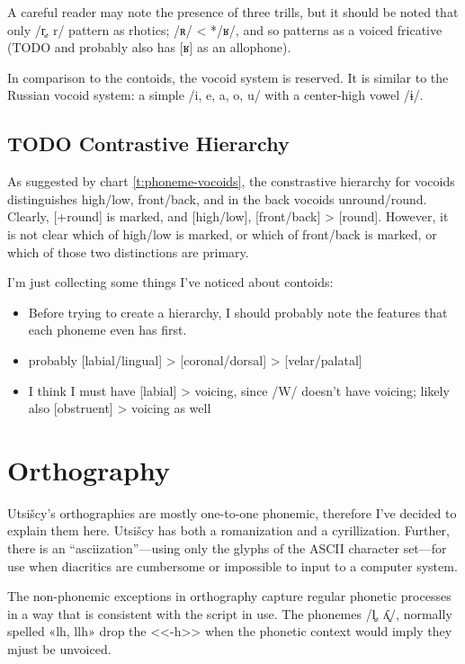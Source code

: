 \documentclass[12pt]{book} %
\begin{document}
A careful reader may note the presence of three trills, but it should be noted that only /r̥, r/ pattern as rhotics; /ʀ/ < */ʁ/, and so patterns as a voiced fricative (TODO and probably also has [ʁ] as an allophone).

In comparison to the contoids, the vocoid system is reserved.
It is similar to the Russian vocoid system: a simple /i, e, a, o, u/ with a center-high vowel /ɨ/.

\subsection{TODO Contrastive Hierarchy}

As suggested by chart \ref{t:phoneme-vocoids}, the constrastive hierarchy for vocoids distinguishes high/low, front/back, and in the back vocoids unround/round.
Clearly, [+round] is marked, and [high/low], [front/back] > [round].
However, it is not clear which of high/low is marked, or which of front/back is marked, or which of those two distinctions are primary.

I'm just collecting some things I've noticed about contoids:
\begin{itemize}
\item Before trying to create a hierarchy, I should probably note the features that each phoneme even has first.
\item probably [labial/lingual] > [coronal/dorsal] > [velar/palatal]
\item  I think I must have [labial] > voicing, since /W/ doesn't have voicing; likely also [obstruent] > voicing as well
\end{itemize}





\section{Orthography}

Utsišcy's orthographies are mostly one-to-one phonemic, therefore I've decided to explain them here.
Utsišcy has both a romanization and a cyrillization.
Further, there is an ``asciization''---using only the glyphs of the ASCII character set---for use when diacritics are cumbersome or impossible to input to a computer system.

The non-phonemic exceptions in orthography capture regular phonetic processes in a way that is consistent with the script in use.
The phonemes /l̥, ʎ̥/, normally spelled «lh, llh» drop the <<-h>> when the phonetic context would imply they mjust be unvoiced.
\end{document}
